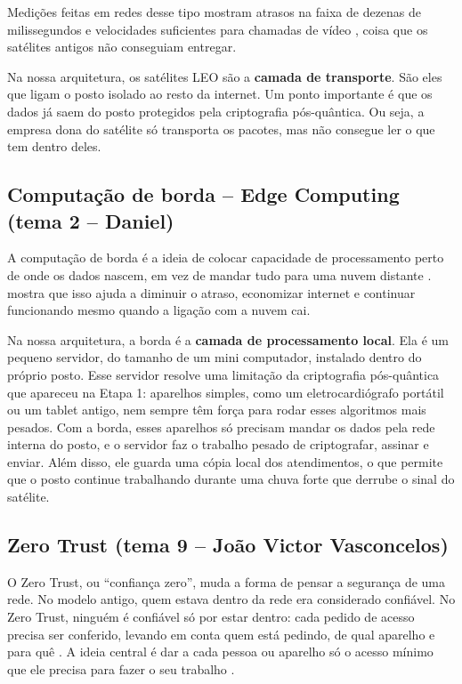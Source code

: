 \documentclass[12pt,a4paper]{article}
\begin{document}
Medições feitas em redes desse tipo mostram atrasos na faixa de dezenas de milissegundos e velocidades suficientes para chamadas de vídeo \cite{michel2022starlink}, coisa que os satélites antigos não conseguiam entregar.

Na nossa arquitetura, os satélites LEO são a \textbf{camada de transporte}. São eles que ligam o posto isolado ao resto da internet. Um ponto importante é que os dados já saem do posto protegidos pela criptografia pós-quântica. Ou seja, a empresa dona do satélite só transporta os pacotes, mas não consegue ler o que tem dentro deles.

\subsection{Computação de borda -- Edge Computing (tema 2 -- Daniel)}

A computação de borda é a ideia de colocar capacidade de processamento perto de onde os dados nascem, em vez de mandar tudo para uma nuvem distante \cite{shi2016edge}.  mostra que isso ajuda a diminuir o atraso, economizar internet e continuar funcionando mesmo quando a ligação com a nuvem cai.

Na nossa arquitetura, a borda é a \textbf{camada de processamento local}. Ela é um pequeno servidor, do tamanho de um mini computador, instalado dentro do próprio posto. Esse servidor resolve uma limitação da criptografia pós-quântica que apareceu na Etapa 1: aparelhos simples, como um eletrocardiógrafo portátil ou um tablet antigo, nem sempre têm força para rodar esses algoritmos mais pesados. Com a borda, esses aparelhos só precisam mandar os dados pela rede interna do posto, e o servidor faz o trabalho pesado de criptografar, assinar e enviar. Além disso, ele guarda uma cópia local dos atendimentos, o que permite que o posto continue trabalhando durante uma chuva forte que derrube o sinal do satélite.

\subsection{Zero Trust (tema 9 -- João Victor Vasconcelos)}

O Zero Trust, ou ``confiança zero'', muda a forma de pensar a segurança de uma rede. No modelo antigo, quem estava dentro da rede era considerado confiável. No Zero Trust, ninguém é confiável só por estar dentro: cada pedido de acesso precisa ser conferido, levando em conta quem está pedindo, de qual aparelho e para quê \cite{rose2020zta}. A ideia central é dar a cada pessoa ou aparelho só o acesso mínimo que ele precisa para fazer o seu trabalho \cite{syed2022zta}.
\end{document}
